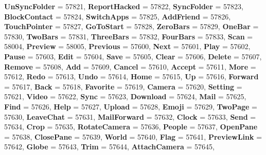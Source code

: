 \begin{DoxyCompactItemize}
{\bfseries Un\+Sync\+Folder} = 57821, 
\newline
{\bfseries Report\+Hacked} = 57822, 
{\bfseries Sync\+Folder} = 57823, 
{\bfseries Block\+Contact} = 57824, 
{\bfseries Switch\+Apps} = 57825, 
\newline
{\bfseries Add\+Friend} = 57826, 
{\bfseries Touch\+Pointer} = 57827, 
{\bfseries Go\+To\+Start} = 57828, 
{\bfseries Zero\+Bars} = 57829, 
\newline
{\bfseries One\+Bar} = 57830, 
{\bfseries Two\+Bars} = 57831, 
{\bfseries Three\+Bars} = 57832, 
{\bfseries Four\+Bars} = 57833, 
\newline
{\bfseries Scan} = 58004, 
{\bfseries Preview} = 58005, 
{\bfseries Previous} = 57600, 
{\bfseries Next} = 57601, 
\newline
{\bfseries Play} = 57602, 
{\bfseries Pause} = 57603, 
{\bfseries Edit} = 57604, 
{\bfseries Save} = 57605, 
\newline
{\bfseries Clear} = 57606, 
{\bfseries Delete} = 57607, 
{\bfseries Remove} = 57608, 
{\bfseries Add} = 57609, 
\newline
{\bfseries Cancel} = 57610, 
{\bfseries Accept} = 57611, 
{\bfseries More} = 57612, 
{\bfseries Redo} = 57613, 
\newline
{\bfseries Undo} = 57614, 
{\bfseries Home} = 57615, 
{\bfseries Up} = 57616, 
{\bfseries Forward} = 57617, 
\newline
{\bfseries Back} = 57618, 
{\bfseries Favorite} = 57619, 
{\bfseries Camera} = 57620, 
{\bfseries Setting} = 57621, 
\newline
{\bfseries Video} = 57622, 
{\bfseries Sync} = 57623, 
{\bfseries Download} = 57624, 
{\bfseries Mail} = 57625, 
\newline
{\bfseries Find} = 57626, 
{\bfseries Help} = 57627, 
{\bfseries Upload} = 57628, 
{\bfseries Emoji} = 57629, 
\newline
{\bfseries Two\+Page} = 57630, 
{\bfseries Leave\+Chat} = 57631, 
{\bfseries Mail\+Forward} = 57632, 
{\bfseries Clock} = 57633, 
\newline
{\bfseries Send} = 57634, 
{\bfseries Crop} = 57635, 
{\bfseries Rotate\+Camera} = 57636, 
{\bfseries People} = 57637, 
\newline
{\bfseries Open\+Pane} = 57638, 
{\bfseries Close\+Pane} = 57639, 
{\bfseries World} = 57640, 
{\bfseries Flag} = 57641, 
\newline
{\bfseries Preview\+Link} = 57642, 
{\bfseries Globe} = 57643, 
{\bfseries Trim} = 57644, 
{\bfseries Attach\+Camera} = 57645, 
\newline

\end{DoxyCompactItemize}
